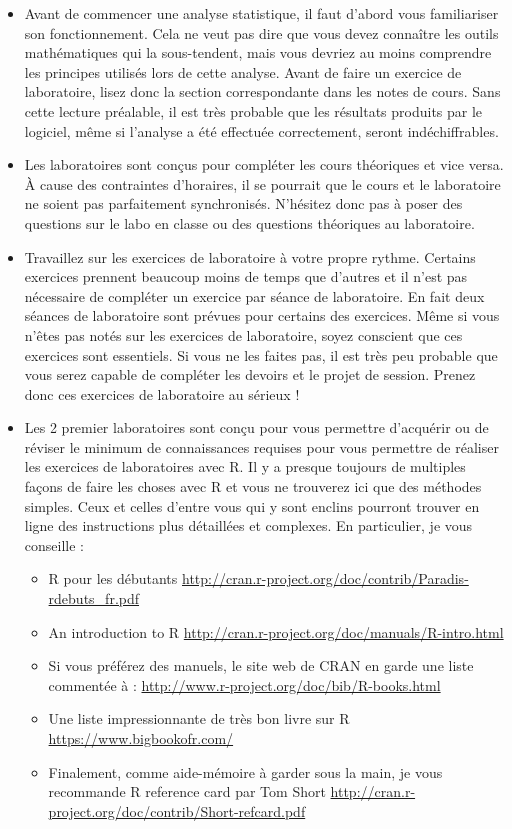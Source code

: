 \documentclass[12pt,]{book}
\providecommand{\tightlist}{%
  \setlength{\itemsep}{0pt}\setlength{\parskip}{0pt}}
\begin{document}
\begin{itemize}
\item
  Avant de commencer une analyse statistique, il faut d'abord vous familiariser son fonctionnement.
  Cela ne veut pas dire que vous devez connaître les outils mathématiques qui la sous-tendent, mais vous devriez au moins comprendre les principes utilisés lors de cette analyse.
  Avant de faire un exercice de laboratoire, lisez donc la section correspondante dans les notes de cours.
  Sans cette lecture préalable, il est très probable que les résultats produits par le logiciel, même si l'analyse a été effectuée correctement, seront indéchiffrables.
\item
  Les laboratoires sont conçus pour compléter les cours théoriques et vice versa.
  À cause des contraintes d'horaires, il se pourrait que le cours et le laboratoire ne soient pas parfaitement synchronisés.
  N'hésitez donc pas à poser des questions sur le labo en classe ou des questions théoriques au laboratoire.
\item
  Travaillez sur les exercices de laboratoire à votre propre rythme.
  Certains exercices prennent beaucoup moins de temps que d'autres et il n'est pas nécessaire de compléter un exercice par séance de laboratoire.
  En fait deux séances de laboratoire sont prévues pour certains des exercices.
  Même si vous n'êtes pas notés sur les exercices de laboratoire, soyez conscient que ces exercices
  sont essentiels.
  Si vous ne les faites pas, il est très peu probable que vous serez capable de compléter les devoirs et le projet de session.
  Prenez donc ces exercices de laboratoire au sérieux !
\item
  Les 2 premier laboratoires sont conçu pour vous permettre d'acquérir ou de réviser le minimum de connaissances requises pour vous permettre de réaliser les exercices de laboratoires avec R.
  Il y a presque toujours de multiples façons de faire les choses avec R et vous ne trouverez ici que des méthodes simples.
  Ceux et celles d'entre vous qui y sont enclins pourront trouver en ligne des instructions plus détaillées et complexes.
  En particulier, je vous conseille :

  \begin{itemize}
  \tightlist
  \item
    R pour les débutants
    \url{http://cran.r-project.org/doc/contrib/Paradis-rdebuts_fr.pdf}
  \item
    An introduction to R
    \url{http://cran.r-project.org/doc/manuals/R-intro.html}
  \item
    Si vous préférez des manuels, le site web de CRAN en garde une liste commentée à :
    \url{http://www.r-project.org/doc/bib/R-books.html}
  \item
    Une liste impressionnante de très bon livre sur R
    \url{https://www.bigbookofr.com/}
  \item
    Finalement, comme aide-mémoire à garder sous la main, je vous recommande R reference card par Tom Short
    \url{http://cran.r-project.org/doc/contrib/Short-refcard.pdf}
  \end{itemize}
\end{itemize}
\end{document}
